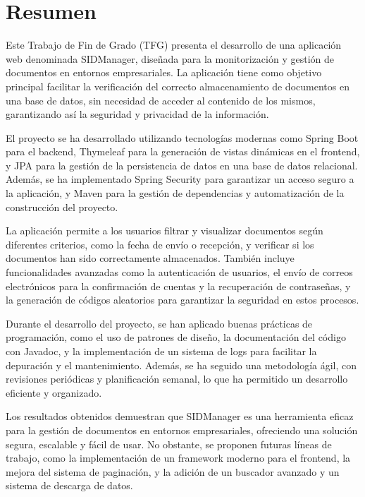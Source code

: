 \documentclass[draft]{scrbook}
\begin{document}
\renewcommand{\listtablename}{Índice de tablas} %
\renewcommand{\tablename}{Tabla}
\renewcommand{\lstlistingname}{Listado}
\renewcommand{\lstlistlistingname}{Índice de \lstlistingname s}

\frontmatter

\chapter{Resumen}
Este Trabajo de Fin de Grado (TFG) presenta el desarrollo de una aplicación web denominada SIDManager, diseñada para la monitorización y gestión de documentos en entornos empresariales. La aplicación tiene como objetivo principal facilitar la verificación del correcto almacenamiento de documentos en una base de datos, sin necesidad de acceder al contenido de los mismos, garantizando así la seguridad y privacidad de la información.

El proyecto se ha desarrollado utilizando tecnologías modernas como Spring Boot para el backend, Thymeleaf para la generación de vistas dinámicas en el frontend, y JPA para la gestión de la persistencia de datos en una base de datos relacional. Además, se ha implementado Spring Security para garantizar un acceso seguro a la aplicación, y Maven para la gestión de dependencias y automatización de la construcción del proyecto.

La aplicación permite a los usuarios filtrar y visualizar documentos según diferentes criterios, como la fecha de envío o recepción, y verificar si los documentos han sido correctamente almacenados. También incluye funcionalidades avanzadas como la autenticación de usuarios, el envío de correos electrónicos para la confirmación de cuentas y la recuperación de contraseñas, y la generación de códigos aleatorios para garantizar la seguridad en estos procesos.

Durante el desarrollo del proyecto, se han aplicado buenas prácticas de programación, como el uso de patrones de diseño, la documentación del código con Javadoc, y la implementación de un sistema de logs para facilitar la depuración y el mantenimiento. Además, se ha seguido una metodología ágil, con revisiones periódicas y planificación semanal, lo que ha permitido un desarrollo eficiente y organizado.

Los resultados obtenidos demuestran que SIDManager es una herramienta eficaz para la gestión de documentos en entornos empresariales, ofreciendo una solución segura, escalable y fácil de usar. No obstante, se proponen futuras líneas de trabajo, como la implementación de un framework moderno para el frontend, la mejora del sistema de paginación, y la adición de un buscador avanzado y un sistema de descarga de datos.
\end{document}
